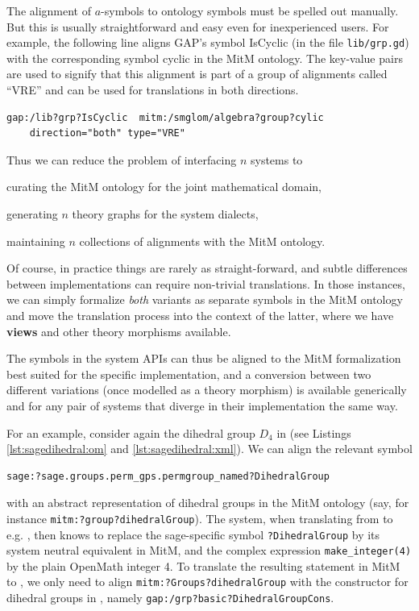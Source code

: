 The alignment of $a$-symbols to ontology symbols must be spelled out manually.
But this is usually straightforward and easy even for inexperienced users. For example, the following line aligns GAP's symbol \textsf{IsCyclic} (in the file \lstinline|lib/grp.gd|) with the corresponding symbol \textsf{cyclic} in the MitM ontology.
The key-value pairs are used to signify that this alignment is part of a group of alignments called ``VRE'' and can be used for translations in both directions.

\begin{lstlisting}
gap:/lib?grp?IsCyclic  mitm:/smglom/algebra?group?cylic
    direction="both" type="VRE"
\end{lstlisting}

Thus we can reduce the problem of interfacing $n$ systems to
\begin{inparaenum}[\em i\rm)]
\item curating the MitM ontology for the joint mathematical domain,
\item generating $n$ theory graphs for the system dialects,
\item maintaining $n$ collections of alignments with the MitM ontology.
\end{inparaenum}\medskip

Of course, in practice things are rarely as straight-forward, and subtle differences between implementations can require non-trivial translations. In those instances, we can simply formalize \emph{both} variants as separate symbols in the MitM ontology and move the translation process into the context of the latter, where we have \MMT \textbf{views} and other theory morphisms available.

The symbols in the system APIs can thus be aligned to the MitM formalization best suited for the specific implementation, and a conversion between two different variations (once modelled as a theory morphism) is available generically and for any pair of systems that diverge in their implementation the same way.
\medskip

For an example, consider again the dihedral group $D_4$ in \Sage (see Listings \ref{lst:sagedihedral:om} and \ref{lst:sagedihedral:xml}). We can align the relevant symbol 
\begin{lstlisting}
sage:?sage.groups.perm_gps.permgroup_named?DihedralGroup
\end{lstlisting}
with an abstract representation of dihedral groups in the MitM ontology (say, for instance \lstinline|mitm:?group?dihedralGroup|).
The \MMT system, when translating from \Sage to e.g. \GAP, then knows to replace the sage-specific symbol \lstinline|?DihedralGroup| by its system neutral equivalent in MitM, and the complex expression \lstinline+make_integer(4)+ by the plain OpenMath integer 4.
To translate the resulting statement in MitM to \GAP, we only need to align \lstinline+mitm:?Groups?dihedralGroup+ with the constructor for dihedral groups in \GAP, namely \lstinline+gap:/grp?basic?DihedralGroupCons+.

